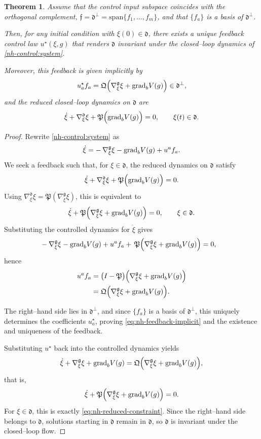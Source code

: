 \documentclass[letterpaper, 10 pt, conference]{ieeeconf}
\newtheorem{theorem}{Theorem}
\newcommand{\g}{\mathfrak{g}}
\newcommand{\h}{\mathfrak{d}}
\newcommand{\grad}{\normalfont{\text{grad}}}
\begin{document}
\begin{theorem}\label{nh-orthogonal:input:thm}
Assume that the control input subspace coincides with the orthogonal complement, $\mathfrak{f} = \h^\perp = \mathrm{span}\{f_1,\dots,f_m\}$, and that $\{f_a\}$ is a basis of $\h^\perp$.

Then, for any initial condition with $\xi(0)\in\h$, there exists a unique feedback 
control law $u^\star(\xi,g)$ that renders $\h$ invariant under the closed--loop 
dynamics of \eqref{nh-control:system}.  

Moreover, this feedback is given implicitly by
\begin{equation}\label{eq:nh-feedback-implicit}
    u^{\star}_a f_a 
    = \mathfrak{Q}\Big(
        \nabla^{\g}_{\xi}\xi 
        + \grad_{b} V(g)
      \Big)\in\h^\perp,
\end{equation}
and the reduced closed--loop dynamics on $\h$ are
\begin{equation}\label{eq:nh-reduced-constraint}
    \dot{\xi} 
    + \nabla^{\h}_{\xi}\xi
    + \mathfrak{P}\Big(
        \grad_{b} V(g)
      \Big) = 0,
    \qquad \xi(t)\in\h.
\end{equation}
\end{theorem}

\begin{proof}
Rewrite \eqref{nh-control:system} as
\[
\dot{\xi} 
= -\,\nabla^{\g}_{\xi}\xi 
  - \grad_{b} V(g)
  + u^{a}f_a.
\]
We seek a feedback such that, for $\xi\in\h$, the reduced dynamics on $\h$ satisfy
\[
\dot{\xi} + \nabla^\h_{\xi}\xi
+ \mathfrak{P}\Big(
    \grad_{b} V(g)
  \Big) = 0.
\]
Using $\nabla^\h_{\xi}\xi = \mathfrak{P}(\nabla^\g_{\xi}\xi)$, this is equivalent to
\[
\dot{\xi} 
+ \mathfrak{P}\Big(
    \nabla^\g_{\xi}\xi 
    + \grad_{b} V(g)
  \Big) = 0,
\qquad \xi\in\h.
\]
Substituting the controlled dynamics for $\dot\xi$ gives
\begin{align}
&-\nabla^{\g}_{\xi}\xi 
 - \grad_{b} V(g)
 + u^{a}f_a +\, \mathfrak{P}\Big(
    \nabla^\g_{\xi}\xi 
    + \grad_{b} V(g)
  \Big) = 0,
\end{align}
hence
\begin{align}
u^{a}f_a
&= \big(I-\mathfrak{P}\big)\Big(
    \nabla^{\g}_{\xi}\xi 
    + \grad_{b} V(g)
  \Big) \nonumber\\
&= \mathfrak{Q}\Big(
    \nabla^{\g}_{\xi}\xi 
    + \grad_{b} V(g)
  \Big).
\end{align}

The right--hand side lies in $\h^\perp$, and since $\{f_a\}$ is a basis of $\h^\perp$, 
this uniquely determines the coefficients $u^{\star}_a$, proving \eqref{eq:nh-feedback-implicit} 
and the existence and uniqueness of the feedback.

Substituting $u^\star$ back into the controlled dynamics yields
\[
\dot{\xi} 
+ \nabla^{\g}_{\xi}\xi 
+ \grad_{b} V(g)
= \mathfrak{Q}\Big(
    \nabla^{\g}_{\xi}\xi 
    + \grad_{b} V(g)
  \Big),
\]
that is,
\[
\dot{\xi} 
+ \mathfrak{P}\Big(
    \nabla^{\g}_{\xi}\xi 
    + \grad_{b} V(g)
  \Big) = 0.
\]
For $\xi\in\h$, this is exactly \eqref{eq:nh-reduced-constraint}.
Since the right--hand side belongs to $\h$, solutions starting in $\h$ remain 
in $\h$, so $\h$ is invariant under the closed--loop flow.
\end{proof}
\end{document}
